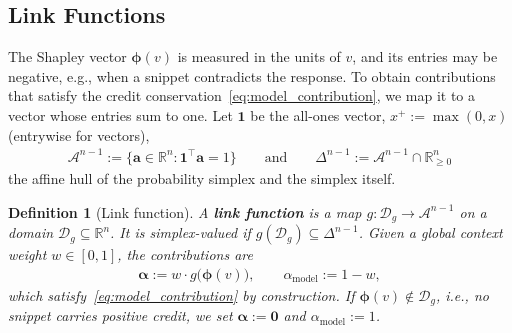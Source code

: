 \documentclass{article}
\newtheorem{definition}[theorem]{Definition}
\begin{document}
\subsection{Link Functions}
\label{subsec:link_functions}

The Shapley vector $\boldsymbol{\phi}(v)$ is measured in the units of $v$, and its entries may be negative, e.g., when a snippet contradicts the response. To obtain contributions that satisfy the credit conservation~\eqref{eq:model_contribution}, we map it to a vector whose entries sum to one. Let $\mathbf{1}$ be the all-ones vector, $x^+ := \max(0, x)$ (entrywise for vectors),
\begin{align*}
    \mathcal{A}^{n-1} := \{\mathbf{a} \in \mathbb{R}^n : \mathbf{1}^\top \mathbf{a} = 1\} \qquad \text{and} \qquad \Delta^{n-1} := \mathcal{A}^{n-1} \cap \mathbb{R}^n_{\ge 0}
\end{align*}
the affine hull of the probability simplex and the simplex itself.

\begin{definition}[Link function]\label{def:link}
A \textbf{link function} is a map $g: \mathcal{D}_g \to \mathcal{A}^{n-1}$ on a domain $\mathcal{D}_g \subseteq \mathbb{R}^n$. It is \emph{simplex-valued} if $g(\mathcal{D}_g) \subseteq \Delta^{n-1}$. Given a global context weight $w \in [0,1]$, the contributions are
\begin{align}\label{eq:link}
    \boldsymbol{\alpha} := w \cdot g\big(\boldsymbol{\phi}(v)\big), \qquad \alpha_{\text{model}} := 1 - w,
\end{align}
which satisfy~\eqref{eq:model_contribution} by construction. If $\boldsymbol{\phi}(v) \notin \mathcal{D}_g$, i.e., no snippet carries positive credit, we set $\boldsymbol{\alpha} := \mathbf{0}$ and $\alpha_{\text{model}} := 1$.
\end{definition}
\end{document}
